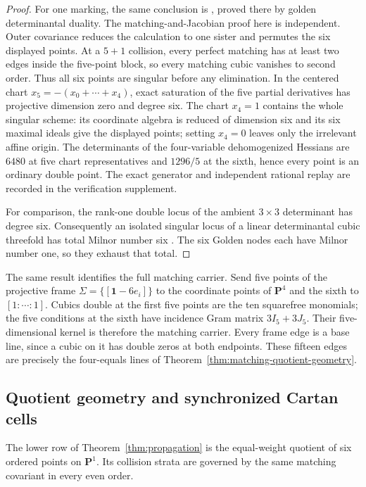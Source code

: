 \documentclass[11pt]{article}
\theoremstyle{definition}
\theoremstyle{remark}
\begin{document}
\begin{proof}
For one marking, the same conclusion is \cite[Corollary~8.3]{RuddRigidity},
proved there by golden determinantal duality.  The matching-and-Jacobian
proof here is independent.  Outer covariance reduces the calculation to one
sister and permutes the six displayed points.  At a \(5+1\) collision,
every perfect matching has at least two edges inside the five-point block,
so every matching cubic
vanishes to second order.  Thus all six points are singular before any
elimination.  In the centered chart
\(x_5=-(x_0+\cdots+x_4)\), exact saturation of the five partial derivatives
has projective dimension zero and degree six.  The chart \(x_4=1\) contains
the whole singular scheme: its coordinate algebra is reduced of dimension
six and its six maximal ideals give the displayed points; setting \(x_4=0\)
leaves only the irrelevant affine origin.  The determinants of the four-variable
dehomogenized Hessians are \(6480\) at five chart representatives and
\(1296/5\) at the sixth, hence every point is an ordinary double point.
The exact generator and independent rational replay are recorded in the
verification supplement.

For comparison, the rank-one double locus of the ambient \(3\times3\)
determinant has degree six.  Consequently an isolated singular locus of a
linear determinantal cubic threefold has total Milnor number six
\cite[Remark~3.6]{DolgachevSegre}.  The six Golden nodes each have Milnor
number one, so they exhaust that total.
\end{proof}

The same result identifies the full matching carrier.  Send five points of
the projective frame \(\Sigma=\{[\mathbf1-6e_i]\}\) to the coordinate points
of \(\mathbf P^4\) and the sixth to \([1:\cdots:1]\).  Cubics double at the
first five points are the ten squarefree monomials; the five conditions at
the sixth have incidence Gram matrix \(3I_5+3J_5\).  Their five-dimensional
kernel is therefore the matching carrier.  Every frame edge is a base line,
since a cubic on it has double zeros at both endpoints.  These fifteen edges
are precisely the four-equals lines of
Theorem~\ref{thm:matching-quotient-geometry}.

\subsection{Quotient geometry and synchronized Cartan cells}

The lower row of Theorem~\ref{thm:propagation} is the equal-weight quotient
of six ordered points on \(\mathbf P^1\).  Its collision strata are governed
by the same matching covariant in every even order.
\end{document}

